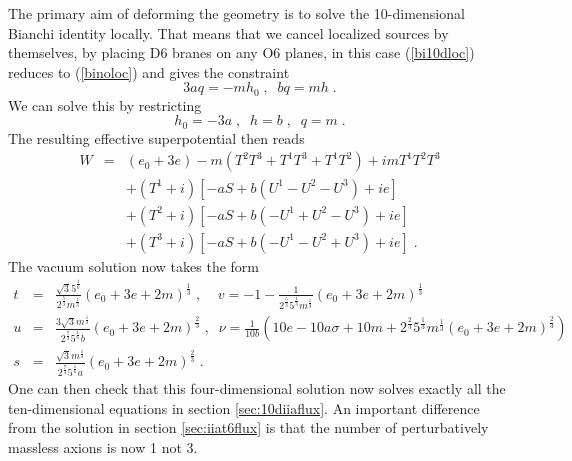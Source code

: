 \documentclass[11pt,a4paper]{article}
\numberwithin{equation}{section}
\numberwithin{table}{section}\setlength{\multlinegap}{25pt}
\newcommand{\bea}{\begin{eqnarray}}  \newcommand{\eea}{\end{eqnarray}}
\newcommand{\nn}{\nonumber}
\newcommand{\be}{\begin{equation}}
\newcommand{\ee}{\end{equation}}
\begin{document}
The primary aim of deforming the geometry is to solve the 10-dimensional Bianchi identity locally. That means that we cancel localized sources by themselves, by placing D6 branes on any O6 planes, in this case (\ref{bi10dloc}) reduces to (\ref{binoloc}) and gives the constraint
\be
3 a q = - m h_0 \;,\;\; b q = m h \;.
\ee 
We can solve this by restricting 
\be
h_0 = - 3 a \;,\;\; h = b \;,\;\; q = m \;.
\label{flt}
\ee
The resulting effective superpotential then reads
\bea
W &=& \left(e_0 + 3 e \right)  -m \left( T^2 T^3 + T^1 T^3 + T^1 T^2 \right) + i m T^1 T^2 T^3 \nn \\
& & + \left(T^1+i \right)\left[-a S + b \left( U^1 - U^2 - U^3 \right) + i e\right] \nn \\
& & + \left(T^2+i \right)\left[-a S + b \left( -U^1 + U^2 - U^3 \right)+ i e\right] \nn \\
& & + \left(T^3+i \right)\left[-a S + b \left( -U^1 - U^2 + U^3 \right)+ i e\right] \;.
\label{wa}
\eea
The vacuum solution now takes the form \cite{Camara:2005dc}
\bea
t &=& \frac{\sqrt{3}5^{\frac16}}{2^{\frac53} m^{\frac13}} \left(e_0 + 3 e + 2 m \right)^{\frac13} \;,\;\;\;\; v= -1 - \frac{1}{2^{\frac53} 5^{\frac13}m^{\frac13}} \left(e_0 + 3 e + 2 m \right)^{\frac13}  \nn \\
u &=& \frac{3\sqrt{3}m^{\frac13}}{2^{\frac73}5^{\frac16} b} \left(e_0 + 3 e + 2 m \right)^{\frac23} \;, \;\; \nu = \frac{1}{10 b} \left( 10 e - 10 a \sigma + 10 m + 2^{\frac23} 5^{\frac13}m^{\frac13} \left(e_0 + 3 e + 2 m \right)^{\frac23} \right) \nn \\
s &=& \frac{\sqrt{3}m^{\frac13}}{2^{\frac73}5^{\frac16} a} \left(e_0 + 3 e + 2 m \right)^{\frac23} \;.
\label{susysol}
\eea
One can then check that this four-dimensional solution now solves exactly all the ten-dimensional equations in section \ref{sec:10diiaflux}. An important difference from the solution in section \ref{sec:iiat6flux} is that the number of perturbatively massless axions is now 1 not 3.
\end{document}
